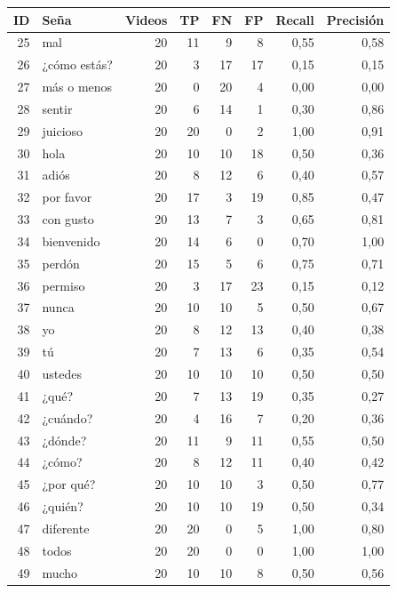 \begin{tabular}{@{}r l r r r r r r@{}}
\toprule
ID & Seña & Videos & TP & FN & FP & Recall & Precisión \\
\midrule
25 & mal & 20 & 11 & 9 & 8 & 0,55 & 0,58 \\
\rowcolor{naranja!15}26 & ¿cómo estás? & 20 & 3 & 17 & 17 & 0,15 & 0,15 \\
\rowcolor{naranja!15}27 & más o menos & 20 & 0 & 20 & 4 & 0,00 & 0,00 \\
28 & sentir & 20 & 6 & 14 & 1 & 0,30 & 0,86 \\
\rowcolor{verde!15}29 & juicioso & 20 & 20 & 0 & 2 & 1,00 & 0,91 \\
30 & hola & 20 & 10 & 10 & 18 & 0,50 & 0,36 \\
31 & adiós & 20 & 8 & 12 & 6 & 0,40 & 0,57 \\
\rowcolor{verde!15}32 & por favor & 20 & 17 & 3 & 19 & 0,85 & 0,47 \\
33 & con gusto & 20 & 13 & 7 & 3 & 0,65 & 0,81 \\
34 & bienvenido & 20 & 14 & 6 & 0 & 0,70 & 1,00 \\
35 & perdón & 20 & 15 & 5 & 6 & 0,75 & 0,71 \\
\rowcolor{naranja!15}36 & permiso & 20 & 3 & 17 & 23 & 0,15 & 0,12 \\
37 & nunca & 20 & 10 & 10 & 5 & 0,50 & 0,67 \\
38 & yo & 20 & 8 & 12 & 13 & 0,40 & 0,38 \\
39 & tú & 20 & 7 & 13 & 6 & 0,35 & 0,54 \\
40 & ustedes & 20 & 10 & 10 & 10 & 0,50 & 0,50 \\
41 & ¿qué? & 20 & 7 & 13 & 19 & 0,35 & 0,27 \\
\rowcolor{naranja!15}42 & ¿cuándo? & 20 & 4 & 16 & 7 & 0,20 & 0,36 \\
43 & ¿dónde? & 20 & 11 & 9 & 11 & 0,55 & 0,50 \\
44 & ¿cómo? & 20 & 8 & 12 & 11 & 0,40 & 0,42 \\
45 & ¿por qué? & 20 & 10 & 10 & 3 & 0,50 & 0,77 \\
46 & ¿quién? & 20 & 10 & 10 & 19 & 0,50 & 0,34 \\
\rowcolor{verde!15}47 & diferente & 20 & 20 & 0 & 5 & 1,00 & 0,80 \\
\rowcolor{verde!15}48 & todos & 20 & 20 & 0 & 0 & 1,00 & 1,00 \\
49 & mucho & 20 & 10 & 10 & 8 & 0,50 & 0,56 \\
\bottomrule
\end{tabular}
